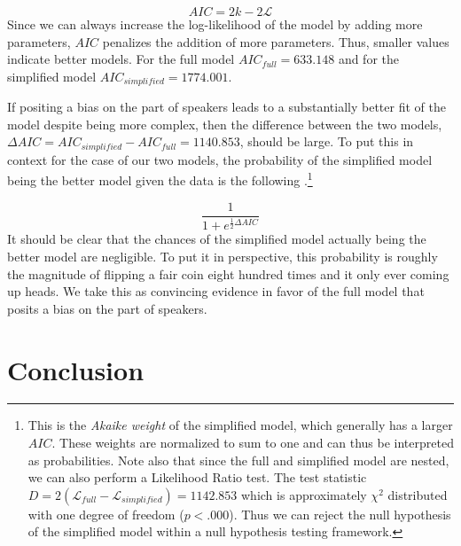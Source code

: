 \documentclass[linguex]{sp}
\theoremstyle{definition} \newtheorem{definition}{Definition}
\begin{document}
\begin{equation}
	AIC = 2k - 2\mathcal{L}
\end{equation}
Since we can always increase the log-likelihood of the model by adding more parameters, $AIC$ penalizes the addition of more parameters. Thus, smaller values indicate better models.  For the full model  $AIC_{full} = 633.148$ and for the simplified model $AIC_{simplified} = 1774.001$. 

If positing a bias on the part of speakers leads to a substantially better fit of the model despite being more complex, then the difference between the two models,  $\Delta AIC = AIC_{simplified} - AIC_{full} = 1140.853$, should be large. To put this in context for the case of our two models, the probability of the simplified model being the better model given the data is the following \citep[74-79]{burnham2003}.\footnote{This is the \emph{Akaike weight} of the simplified model, which generally has a larger $AIC$. These weights are normalized to sum to one and can thus be interpreted as probabilities. Note also that since the full and simplified model are nested, we can also perform a Likelihood Ratio test. The test statistic $D = 2(\mathcal{L}_{full} - \mathcal{L}_{simplified}) = 1142.853$ which is approximately $\chi^2$ distributed with one degree of freedom ($p < .000$). Thus we can reject the null hypothesis of the simplified model within a null hypothesis testing framework.}

\begin{equation}
	\frac{1}{1 + e^{\frac{1}{2}\Delta AIC}}
\end{equation}
It should be clear that the chances of the simplified model actually being the better model are negligible. To put it in perspective, this probability is roughly the magnitude of flipping a fair coin eight hundred times and it only ever coming up heads. We take this as convincing evidence in favor of the full model that posits a bias on the part of speakers.

\section{Conclusion}
\label{Conclusion}
\end{document}
